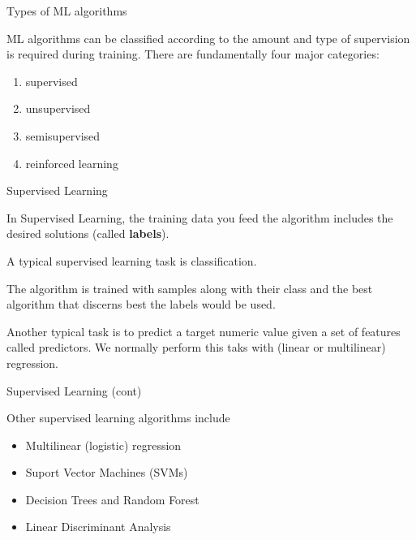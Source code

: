 \documentclass[11pt, aspectratio=43]{beamer}
\begin{document}
\begin{frame}{Types of ML algorithms}
		
	ML algorithms can be classified according to the amount and type of supervision is required during training. There are fundamentally four major categories: 
	\begin{enumerate}
		\item supervised
		\item unsupervised
		\item semisupervised
		\item reinforced learning
	\end{enumerate}
	
\end{frame}

\begin{frame}{Supervised Learning}
	
	In Supervised Learning, the training data you feed the algorithm includes the desired solutions (called \textbf{labels}).
	
	A typical supervised learning task is classification. 
	
	The algorithm is trained with samples along with their class and the best algorithm that discerns best the labels would be used.
	
	Another typical task is to predict a target numeric value given a set of features called predictors. We normally perform this taks with (linear or multilinear) regression.

\end{frame}


\begin{frame}{Supervised Learning (cont)}
	
	
	Other supervised learning algorithms include
	\begin{itemize}
		\item 	Multilinear (logistic) regression
		\item 	Suport Vector Machines (SVMs)
		\item 	Decision Trees and Random Forest
		\item  Linear Discriminant Analysis
	\end{itemize}


\end{frame}
\end{document}

